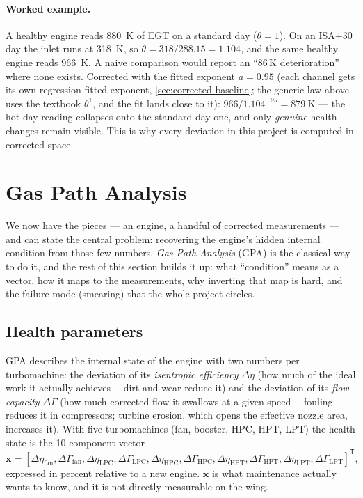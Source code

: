\paragraph{Worked example.} A healthy engine reads \SI{880}{\kelvin} of EGT on a standard day
($\theta = 1$). On an ISA$+30$ day the inlet runs at \SI{318}{\kelvin}, so
$\theta = 318/288.15 = 1.104$, and the same healthy engine reads \SI{966}{\kelvin}. A naive
comparison would report an ``$86$\,K deterioration'' where none exists. Corrected with the
fitted exponent $a = 0.95$ (each channel gets its own regression-fitted exponent,
\cref{sec:corrected-baseline}; the generic law above uses the textbook $\theta^{1}$, and the
fit lands close to it): $966 / 1.104^{0.95} = \SI{879}{\kelvin}$ --- the hot-day reading
collapses onto the standard-day one, and only \emph{genuine} health changes remain visible.
This is why every deviation in this project is computed in corrected space.

\section{Gas Path Analysis}
\label{sec:gpa}

We now have the pieces --- an engine, a handful of corrected measurements --- and can state the
central problem: recovering the engine's hidden internal condition from those few numbers.
\emph{Gas Path Analysis} (GPA) is the classical way to do it, and the rest of this section
builds it up: what ``condition'' means as a vector, how it maps to the measurements, why
inverting that map is hard, and the failure mode (smearing) that the whole project circles.

\subsection{Health parameters}

GPA describes the internal state of the engine with two numbers per turbomachine: the deviation
of its \emph{isentropic efficiency} $\Delta\eta$ (how much of the ideal work it actually
achieves ---dirt and wear reduce it) and the deviation of its \emph{flow capacity}
$\Delta\Gamma$ (how much corrected flow it swallows at a given speed ---fouling reduces it in
compressors; turbine erosion, which opens the effective nozzle area, increases it). With five
turbomachines (fan, booster, HPC, HPT, LPT) the health state is the 10-component vector
\begin{equation}
  \mathbf{x} = \left[\Delta\eta_{\mathrm{fan}}, \Delta\Gamma_{\mathrm{fan}},
  \Delta\eta_{\mathrm{LPC}}, \Delta\Gamma_{\mathrm{LPC}},
  \Delta\eta_{\mathrm{HPC}}, \Delta\Gamma_{\mathrm{HPC}},
  \Delta\eta_{\mathrm{HPT}}, \Delta\Gamma_{\mathrm{HPT}},
  \Delta\eta_{\mathrm{LPT}}, \Delta\Gamma_{\mathrm{LPT}}\right]^{\mathsf T},
\end{equation}
expressed in percent relative to a new engine. $\mathbf{x}$ is what maintenance actually wants
to know, and it is not directly measurable on the wing.

